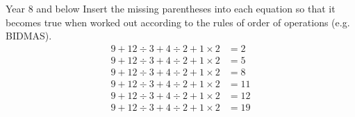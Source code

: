    \begin{MyInnerBox}{Year 8 and below}
     Insert the missing parentheses into each equation so that it becomes true when worked out according to the rules of order of operations (e.g. BIDMAS).
     \LARGE{\begin{align*}
       9 + 12 \div 3 + 4 \div 2 + 1\times 2 &= 2\\
       9 + 12 \div 3 + 4 \div 2 + 1\times 2 &= 5\\
       9 + 12 \div 3 + 4 \div 2 + 1\times 2 &= 8\\
       9 + 12 \div 3 + 4 \div 2 + 1\times 2 &= 11\\
       9 + 12 \div 3 + 4 \div 2 + 1\times 2 &= 12\\
       9 + 12 \div 3 + 4 \div 2 + 1\times 2 &= 19
   \end{align*}}
      \iftoggle{SOLUTION}{%
      \begin{MySolutionBox}
     \Large{\begin{align*}
       \shortintertext{First, with no brackets:}
       9 + 12 \div 3 + 4 \div 2 + 1\times 2 &= 17\\
       (9 + 12) \div (3 + 4) \div (2 + 1)\times 2 &= 2\\
       (((9 + 12) \div (3 + 4) \div 2) + 1)\times 2 &= 5\\
       (9 + 12) \div 3 + 4 \div (2 + 1\times 2) &= 8\\
       (9 + 12) \div 3 + 4 \div 2 + 1\times 2 &= 11\\
       9 + (12 \div 3 + 4) \div (2 + 1\times 2) &= 11\\
       9 + 12 \div (3 + (4 \div (2 + 1\times 2))) &= 12\\
       (((9 + (12 \div 3) + 4) \div 2) + 1)\times 2 &= 19
   \end{align*}}
      \end{MySolutionBox}
    }{}%
    \end{MyInnerBox}


